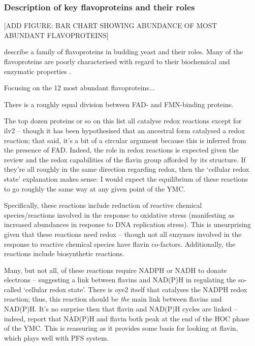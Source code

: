 \subsubsection{Description of key flavoproteins and their roles}
\label{subsubsec:intro-flavin-biochem-descriptions}

[ADD FIGURE: BAR CHART SHOWING ABUNDANCE OF MOST ABUNDANT FLAVOPROTEINS]

\citet{gudipatiFlavoproteomeYeastSaccharomyces2014} describe a family of flavoproteins in budding yeast and their roles. %
Many of the flavoproteins are poorly characterised with regard to their biochemical and enzymatic properties \citep{kochStructureBiochemicalKinetic2017}.

Focusing on the 12 most abundant \citep{hoUnificationProteinAbundance2018} flavoproteins...

There is a roughly equal division between FAD- and FMN-binding proteins.

The top dozen proteins or so on this list all catalyse redox reactions except for ilv2 -- though it has been hypothesised that an ancestral form catalysed a redox reaction; that said, it's a bit of a circular argument because this is inferred from the presence of FAD.
Indeed, the role in redox reactions is expected given the review and the redox capabilities of the flavin group afforded by its structure.
If they're all roughly in the same direction regarding redox, then the `cellular redox state' explanation makes sense: I would expect the equilibrium of these reactions to go roughly the same way at any given point of the YMC.

Specifically, these reactions include reduction of reactive chemical species/reactions involved in the response to oxidative stress (manifesting as increased abundances in response to DNA replication stress).
This is unsurprising given that these reactions need redox -- though not all enzymes involved in the response to reactive chemical species have flavin co-factors.
Additionally, the reactions include biosynthetic reactions.

Many, but not all, of these reactions require NADPH or NADH to donate electrons -- suggesting a link between flavins and NAD(P)H in regulating the so-called `cellular redox state'.
There is oye2 itself that catalyses the NADPH redox reaction; thus, this reaction should be \emph{the} main link between flavins and NAD(P)H.
It's no surprise then that flavin and NAD(P)H cycles are linked -- indeed, \citet{murrayRedoxRegulationRespiring2011} report that NAD(P)H and flavin both peak at the end of the HOC phase of the YMC.
This is reassuring as it provides some basis for looking at flavin, which plays well with PFS system.

